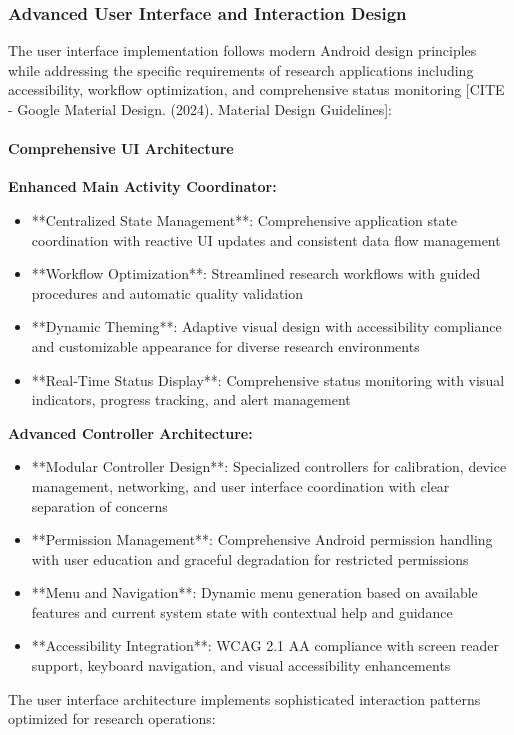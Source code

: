\documentclass[12pt,a4paper]{report}
\begin{document}
\subsubsection{Advanced User Interface and Interaction Design}

The user interface implementation follows modern Android design principles while addressing the specific requirements of
research applications including accessibility, workflow optimization, and comprehensive status
monitoring [CITE - Google Material Design. (2024). Material Design Guidelines]:

\paragraph{Comprehensive UI Architecture}

\textbf{Enhanced Main Activity Coordinator:}

\begin{itemize}
\item **Centralized State Management**: Comprehensive application state coordination with reactive UI updates and consistent
  data flow management
\item **Workflow Optimization**: Streamlined research workflows with guided procedures and automatic quality validation
\item **Dynamic Theming**: Adaptive visual design with accessibility compliance and customizable appearance for diverse
  research environments
\item **Real-Time Status Display**: Comprehensive status monitoring with visual indicators, progress tracking, and alert
  management

\end{itemize}
\textbf{Advanced Controller Architecture:}

\begin{itemize}
\item **Modular Controller Design**: Specialized controllers for calibration, device management, networking, and user
  interface coordination with clear separation of concerns
\item **Permission Management**: Comprehensive Android permission handling with user education and graceful degradation for
  restricted permissions
\item **Menu and Navigation**: Dynamic menu generation based on available features and current system state with contextual
  help and guidance
\item **Accessibility Integration**: WCAG 2.1 AA compliance with screen reader support, keyboard navigation, and visual
  accessibility enhancements

\end{itemize}
The user interface architecture implements sophisticated interaction patterns optimized for research operations:
\end{document}
